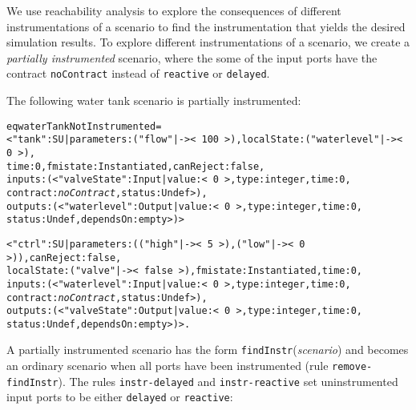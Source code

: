 We use reachability analysis to explore the consequences of different
instrumentations of a scenario to find the instrumentation that yields
the desired simulation results. 
To explore different instrumentations of a scenario, we create a
\emph{partially instrumented} scenario, where the some of the input ports
have the contract \texttt{noContract} instead of 
\texttt{reactive} or \texttt{delayed}. 
\begin{example}
The following water tank scenario is partially instrumented:

\scriptsize
\begin{alltt}
eq waterTankNotInstrumented = 
< "tank" : SU | parameters : ("flow" |-> <\,100\,>),  localState : ("waterlevel" |-> <\,0\,>),
              time : 0,  fmistate : Instantiated, canReject : false, 
              inputs : (< "valveState" : Input | value : <\,0\,>, type : integer, time : 0,
                                                 contract : \emph{noContract}, status : Undef >), 
              outputs : (< "waterlevel" : Output | value : <\,0\,>, type : integer, time : 0,
                                                   status : Undef, dependsOn : empty >) >

< "ctrl" : SU | parameters : (("high" |-> <\,5\,>) , ("low" |-> <\,0\,>)), canReject : false, 
              localState : ("valve" |-> <\,false\,>), fmistate : Instantiated, time : 0, 
              inputs : (< "waterlevel" : Input | value : <\,0\,>, type : integer, time : 0,
                                                 contract : \emph{noContract}, status : Undef >), 
              outputs : (< "valveState" : Output | value : <\,0\,>, type : integer, time : 0,
                                                   status : Undef, dependsOn : empty >) > . 

\end{alltt}
\normalsize
\end{example}

A partially instrumented scenario has the form
\texttt{findInstr}(\emph{scenario}) and becomes an ordinary scenario
when all ports have been instrumented (rule
\texttt{remove-findInstr}). 
The rules \texttt{instr-delayed} and \texttt{instr-reactive} set
uninstrumented input ports to be either \texttt{delayed} or
\texttt{reactive}: 

